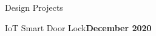 \documentclass{resume} %
\begin{document}
\begin{rSection}{Design Projects}
\begin{rSubsection}{IoT Smart Door Lock}{\bf December 2020}{}{}
	
\end{rSubsection}
	
	





	
	
	
	
	
	
	

\end{rSection}
\end{document}
